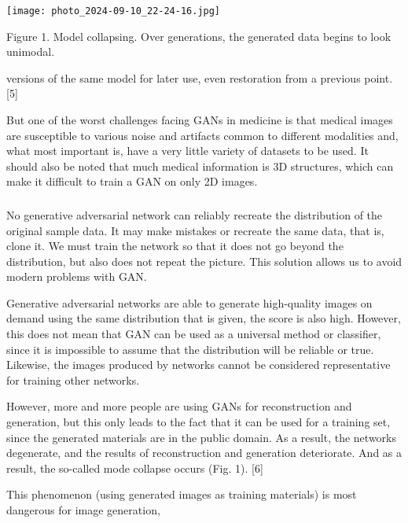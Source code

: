 \documentclass[twocolumn, 10pt]{article}
\begin{document}
\begin{multicols}{2}
{\centering
\texttt{[image: photo\_2024-09-10\_22-24-16.jpg]}

\caption{\small{Figure 1. Model collapsing. Over generations, the generated data begins to look unimodal. \hfill}}}
\setlength{\parskip}{1.0cm}

\noindent versions of the same model for later use, even restoration
from a previous point. [5]
\setlength{\parskip}{0.0cm}

But one of the worst challenges facing GANs in
medicine is that medical images are susceptible to various noise and artifacts common to different modalities
and, what most important is, have a very little variety of
datasets to be used. It should also be noted that much
medical information is 3D structures, which can make it
difficult to train a GAN on only 2D images.

\subsubsection*{}


No generative adversarial network can reliably recreate
the distribution of the original sample data. It may make
mistakes or recreate the same data, that is, clone it. We
must train the network so that it does not go beyond the
distribution, but also does not repeat the picture. This
solution allows us to avoid modern problems with GAN.

Generative adversarial networks are able to generate
high-quality images on demand using the same distribution that is given, the score is also high. However, this
does not mean that GAN can be used as a universal
method or classifier, since it is impossible to assume
that the distribution will be reliable or true. Likewise,
the images produced by networks cannot be considered
representative for training other networks.

However, more and more people are using GANs for
reconstruction and generation, but this only leads to the
fact that it can be used for a training set, since the
generated materials are in the public domain. As a result,
the networks degenerate, and the results of reconstruction
and generation deteriorate. And as a result, the so-called
mode collapse occurs (Fig. 1). [6]

This phenomenon (using generated images as training materials) is most dangerous for image generation,




\end{multicols}
\end{document}
